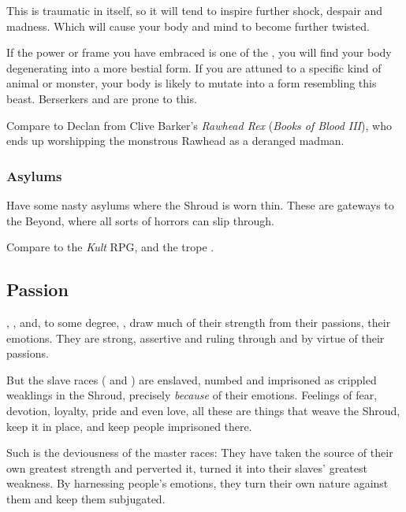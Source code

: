 This is traumatic in itself, so it will tend to inspire further shock, despair and madness. Which will cause your body and mind to become further twisted. 

If the power or frame you have embraced is one of the \Wylde{}, you will find your body degenerating into a more bestial form. If you are attuned to a specific kind of animal or monster, your body is likely to mutate into a form resembling this beast. Berserkers and \rangers{} are prone to this. 

Compare to Declan from Clive Barker's \emph{Rawhead Rex} (\emph{Books of Blood III}), who ends up worshipping the monstrous Rawhead as a deranged madman.





\subsubsection{Asylums}
Have some nasty asylums where the Shroud is worn thin. These are gateways to the Beyond, where all sorts of horrors can slip through. 

Compare to the \emph{Kult} RPG, and the trope . 









\subsection{Passion}
\Dragons, \resphain, \cuezcans{} and, to some degree, \nephilim, draw much of their strength from their passions, their emotions. They are strong, assertive and ruling through and by virtue of their passions. 

But the slave races (\scathae{} and \humans) are enslaved, numbed and imprisoned as crippled weaklings in the Shroud, precisely \emph{because} of their emotions. Feelings of fear, devotion, loyalty, pride and even love, all these are things that weave the Shroud, keep it in place, and keep people imprisoned there.

Such is the deviousness of the master races: They have taken the source of their own greatest strength and perverted it, turned it into their slaves' greatest weakness. By harnessing people's emotions, they turn their own nature against them and keep them subjugated. 















